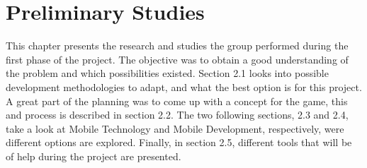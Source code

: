 \chapter{Preliminary Studies}

This chapter presents the research and studies the group performed during the first phase of 
the project. The objective was to obtain a good understanding of the problem and which 
possibilities existed. Section 2.1 looks into possible development methodologies to 
adapt, and what the best option is for this project. A great part of the planning was to 
come up with a concept for the game, this and process is described in section 2.2. The two following 
sections, 2.3 and 2.4, take a look at Mobile Technology and Mobile Development, respectively, were different 
options are explored. Finally, in section 2.5, different tools that will be of help during the 
project are presented.